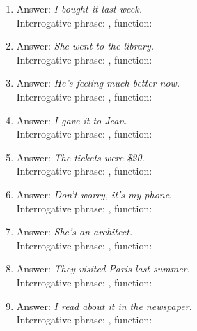 \begin{tcolorbox}[title=Practice, colback=white, parbox]
\begin{enumerate}[noitemsep]
            \item Answer: \textit{I bought it last week.}\\
            Interrogative phrase: \uline{\phantom{xxxxxxxxxx}}, function: \uline{\phantom{xxxxxxxxxx}}

            \item Answer: \textit{She went to the library.}\\
            Interrogative phrase: \uline{\phantom{xxxxxxxxxx}}, function: \uline{\phantom{xxxxxxxxxx}}

            \item Answer: \textit{He's feeling much better now.}\\
            Interrogative phrase: \uline{\phantom{xxxxxxxxxx}}, function: \uline{\phantom{xxxxxxxxxx}}

            \item Answer: \textit{I gave it to Jean.}\\
            Interrogative phrase: \uline{\phantom{xxxxxxxxxx}}, function: \uline{\phantom{xxxxxxxxxx}}

            \item Answer: \textit{The tickets were \$20.}\\
            Interrogative phrase: \uline{\phantom{xxxxxxxxxx}}, function: \uline{\phantom{xxxxxxxxxx}}

            \item Answer: \textit{Don't worry, it's my phone}.\\
            Interrogative phrase: \uline{\phantom{xxxxxxxxxx}}, function: \uline{\phantom{xxxxxxxxxx}}

            \item Answer: \textit{She's an architect.}\\
            Interrogative phrase: \uline{\phantom{xxxxxxxxxx}}, function: \uline{\phantom{xxxxxxxxxx}}

            \item Answer: \textit{They visited Paris last summer.}\\
            Interrogative phrase: \uline{\phantom{xxxxxxxxxx}}, function: \uline{\phantom{xxxxxxxxxx}}

            \item Answer: \textit{I read about it in the newspaper.}\\
            Interrogative phrase: \uline{\phantom{xxxxxxxxxx}}, function: \uline{\phantom{xxxxxxxxxx}}


        \end{enumerate}
    \end{tcolorbox}

